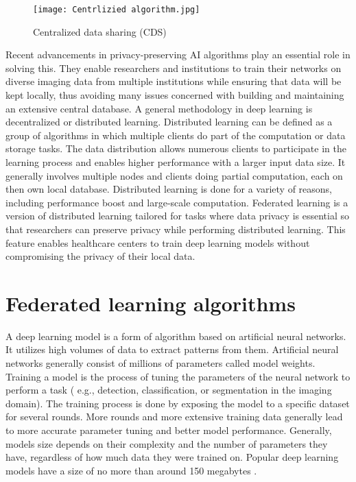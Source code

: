 \begin{figure}[h!]
 \centering
  \texttt{[image: Centrlizied algorithm.jpg]}
  \caption{Centralized data sharing (CDS)}
  \label{fig:CDS}
\end{figure}

Recent advancements in privacy-preserving AI algorithms play an essential role in solving this. They enable researchers and institutions to train their networks on diverse imaging data from multiple institutions while ensuring that data will be kept locally, thus avoiding many issues concerned with building and maintaining an extensive central database. A general methodology in deep learning is decentralized or distributed learning. Distributed learning can be defined as a group of algorithms in which multiple clients do part of the computation or data storage tasks. The data distribution allows numerous clients to participate in the learning process and enables higher performance with a larger input data size. It generally involves multiple nodes and clients doing partial computation, each on then own local database. Distributed learning is done for a variety of reasons, including performance boost and large-scale computation. Federated learning is a version of distributed learning tailored for tasks where data privacy is essential so that researchers can preserve privacy while performing distributed learning. This feature enables healthcare centers to train deep learning models without compromising the privacy of their local data. 


\section{Federated learning algorithms}
\label{sec:FL algorithms}


A deep learning model is a form of algorithm based on artificial neural networks. It utilizes high volumes of data to extract patterns from them. Artificial neural networks generally consist of millions of parameters called model weights. Training a model is the process of tuning the parameters of the neural network to perform a task ( e.g., detection, classification, or segmentation in the imaging domain). The training process is done by exposing the model to a specific dataset for several rounds. 
More rounds and more extensive training data generally lead to more accurate parameter tuning and better model performance.  Generally, models size depends on their complexity and the number of parameters they have, regardless of how much data they were trained on. Popular deep learning models have a size of no more than around 150 megabytes \cite{canziani2016analysis}.

